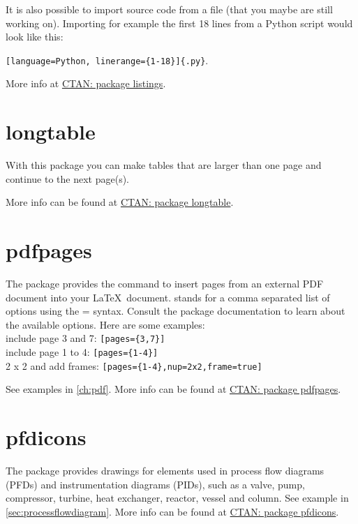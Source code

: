 It is also possible to import source code from a file (that you maybe are still working on). Importing for example the first 18 lines from a Python script would look like this:

\verb|[language=Python, linerange={1-18}]{|\verb|.py}|.

More info at \href{https://ctan.org/pkg/listings?lang=en}{CTAN: package listings}.

\section{longtable}
With this package you can make tables that are larger than one page and continue to the next page(s).

More info can be found at \href{https://ctan.org/pkg/longtable?lang=en}{CTAN: package longtable}.

\section{pdfpages}
The package  provides the command  to insert pages from an external PDF document into your \LaTeX\ document.  stands for a comma separated list of options using the = syntax. Consult the package documentation to learn about the available options. Here are some examples:\\
include page 3 and 7: \verb|[pages={3,7}]|\\
include page 1 to 4: \verb|[pages={1-4}]|\\
2 x 2 and add frames: \verb|[pages={1-4},nup=2x2,frame=true]|

See examples in \cref{ch:pdf}. More info can be found at \href{https://ctan.org/pkg/pdfpages}{CTAN: package pdfpages}.

\section{pfdicons}\label{sec:pfdicons}
The package  provides drawings for elements used in process flow diagrams (PFDs) and instrumentation diagrams (PIDs), such as a valve, pump, compressor, turbine, heat exchanger, reactor, vessel and column. See example in \cref{sec:processflowdiagram}. More info can be found at \href{https://ctan.org/pkg/pfdicons}{CTAN: package pfdicons}.

